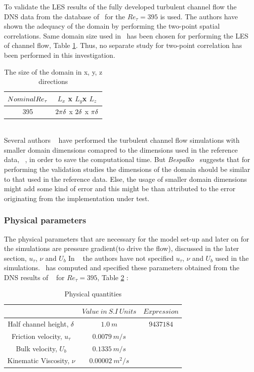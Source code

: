 To validate the LES results of the fully developed turbulent channel flow the DNS data from the database of~\cite{moser:kim:mansour:99} for the $Re_\tau = 395$ is used. The authors have shown the adequacy of the domain by performing the two-point spatial correlations. Same domain size used in~\cite{moser:kim:mansour:99} has been chosen for performing the LES of channel flow, Table \ref{Computational Domain}. Thus, no separate study for two-point correlation has been performed in this investigation.
%
\begin{table}[!h]
\centering
\begin{tabular}{c|c}
\hline
$Nominal Re_{\tau}$ & $L_x$ x $L_y $x $L_z$ \\
\hline
%
395   &  $2\pi\delta$ x $2\delta$ x $\pi\delta$  \\
\hline
\end{tabular}
\caption{The size of the domain in x, y, z directions}
\label{Computational Domain}
\end{table}\\
%
Several authors ~\cite{Freitas:11, sonja:12} have performed the turbulent channel flow simulations with smaller domain dimensions comapred to the dimensions used in the reference data, ~\cite{moser:kim:mansour:99}, in order to save the computational time. But \emph{Bespalko}~\cite{bespalko:11} suggests that for performing the validation studies the dimensions of the domain should be similar to that used in the reference data. Else, the usage of smaller domain dimensions might add some kind of error and this might be than attributed to the error originating from the implementation under test.

\subsubsection{Physical parameters}
The physical parameters that are necessary for the model set-up and later on for the simulations are pressure gradient(to drive the flow), discussed in the later section, $u_\tau$, $\nu$ and $U_b$
In ~\cite{moser:kim:mansour:99} the authors have not specified $u_\tau$, $\nu$ and $U_b$ used in the simulations.~\cite{devilliers:phd} has computed and specified these parameters obtained from the DNS results of ~\cite{moser:kim:mansour:99} for $Re_\tau = 395$, Table \ref{Physical quantities}  :

%
\begin{table}[!h]
\centering
\begin{tabular}{c|c|c}
$ $ & $Value\ in\ S.I\ Units$ & $Expression$ \\
\hline
%
Half channel height, $\delta$ & $1.0\ m$ & $9437184$ \\
\hline
%
Friction velocity, $u_\tau$ & $0.0079\ m/s$ & $ $ \\
\hline
%
Bulk velocity, $U_b$ & $0.1335\ m/s$ & $ $ \\
\hline
%
Kinematic Viscosity, $\nu$ & $0.00002\ m^2/s$ & $ $ \\
\hline
%
\end{tabular}
\caption{Physical quantities}
\label{Physical quantities}
\end{table}
%
 
